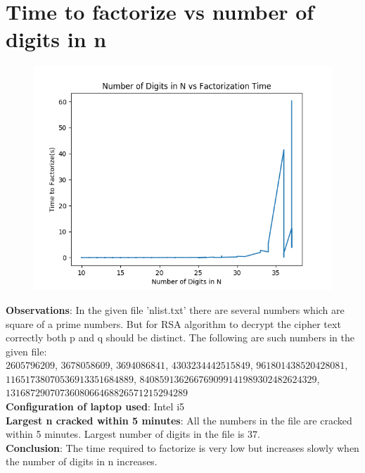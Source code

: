 \documentclass{exam}
\begin{document}
\section{Time to factorize vs number of digits in n}
\begin{figure}[h]
\centering
\includegraphics[scale=0.8]{rsa_plot.png}
\end{figure}
\textbf{Observations}:
In the given file 'nlist.txt' there are several numbers which are square of a prime numbers. But for RSA algorithm to decrypt the cipher text correctly both p and q should be distinct. The following are such numbers in the given file: \\
$2605796209$, $3678058609$, $3694086841$, $4303234442515849$, $961801438520428081$, $11651738070536913351684889$, $840859136266769099141989302482624329$, $1316872907073608066468826571215294289$ \vspace{0.05in} \\
\textbf{Configuration of laptop used}: Intel i5 \vspace{0.05in} \\
\textbf{Largest n cracked within 5 minutes}: All the numbers in the file are cracked within 5 minutes. Largest number of digits in the file is $37$. \vspace{0.05in} \\
\textbf{Conclusion}: The time required to factorize is very low but increases slowly when the number of digits in n increases.
\end{document}
